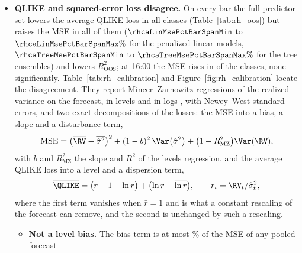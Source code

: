 \begin{itemize}
\begin{itemize}
    most in \rhcaWorstYrRidgeCloseOos{} ($\Delta\% = \rhcaWorstYrPctRidgeCloseOos$ for ridge regression). Over the whole
    span the two halves offset, and no linear change is significant.
  \item Against the closing-interval HAR benchmark, which has no forecast before \rhcaCloseFirst, every pooled forecast
    has the higher loss on $\mathcal T_{\mathrm{oos}}$ (Section~\ref{sec:rh_results_classes}). The models trained on the
    closing half hour come closer: the closing-interval lasso on the full predictor set has the lowest loss of
    Table~\ref{tab:rh_close_accuracy} ($\Delta\% = \rhcaGapCiLassoFullCloseOos$ against the benchmark,
    $\DM = \rhcaGapDmCiLassoFullCloseOos$, \rhcaGapPCiLassoFullCloseOos).
  \end{itemize}

\item \textbf{QLIKE and squared-error loss disagree.} On every bar the full predictor set lowers the average QLIKE loss
  in all \rhorAfPairs{} classes (Table~\ref{tab:rh_oos}) but raises the MSE in all of them
  ($\rhcaLinMsePctBarSpanMin$ to $\rhcaLinMsePctBarSpanMax\%$ for the penalized linear models, $\rhcaTreeMsePctBarSpanMin$
  to $\rhcaTreeMsePctBarSpanMax\%$ for the tree ensembles) and lowers $R^2_{\mathrm{OOS}}$; at 16:00 the MSE rises in
  \rhcaNMseHigherCloseSpan{} of the classes, none significantly. Table~\ref{tab:rh_calibration} and
  Figure~\ref{fig:rh_calibration} locate the disagreement. They report Mincer--Zarnowitz regressions of the realized
  variance on the forecast, in levels and in logs \citep{MincerZarnowitz1969}, with Newey--West standard errors, and
  two exact decompositions of the losses: the MSE into a bias, a slope and a disturbance term,
  \[
    \mathrm{MSE} = \bigl(\overline{\RV} - \overline{\hat\sigma^2}\bigr)^2 + (1 - b)^2\,\Var\bigl(\hat\sigma^2\bigr)
      + \bigl(1 - R^2_{\mathrm{MZ}}\bigr)\Var(\RV),
  \]
  with $b$ and $R^2_{\mathrm{MZ}}$ the slope and $R^2$ of the levels regression, and the average QLIKE loss into a level
  and a dispersion term,
  \[
    \overline{\QLIKE} = \bigl(\bar r - 1 - \ln\bar r\bigr) + \bigl(\ln\bar r - \overline{\ln r}\bigr),
    \qquad r_t = \RV_t/\hat\sigma^2_t ,
  \]
  where the first term vanishes when $\bar r = 1$ and is what a constant rescaling of the forecast can remove, and the
  second is unchanged by such a rescaling.
  \begin{itemize}
  \item \textbf{Not a level bias.} The bias term is at most \rhcaAllShBiasBarOosMax\% of the MSE of any pooled forecast

\end{itemize}
\end{itemize}
